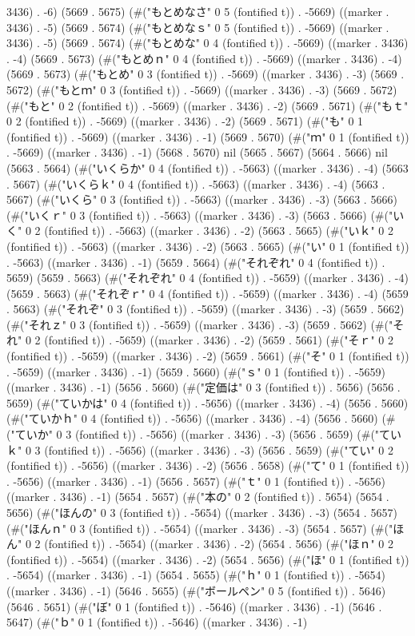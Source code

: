 3436) . -6) (5669 . 5675) (#("もとめなさ" 0 5 (fontified t)) . -5669) ((marker . 3436) . -5) (5669 . 5674) (#("もとめなｓ" 0 5 (fontified t)) . -5669) ((marker . 3436) . -5) (5669 . 5674) (#("もとめな" 0 4 (fontified t)) . -5669) ((marker . 3436) . -4) (5669 . 5673) (#("もとめｎ" 0 4 (fontified t)) . -5669) ((marker . 3436) . -4) (5669 . 5673) (#("もとめ" 0 3 (fontified t)) . -5669) ((marker . 3436) . -3) (5669 . 5672) (#("もとｍ" 0 3 (fontified t)) . -5669) ((marker . 3436) . -3) (5669 . 5672) (#("もと" 0 2 (fontified t)) . -5669) ((marker . 3436) . -2) (5669 . 5671) (#("もｔ" 0 2 (fontified t)) . -5669) ((marker . 3436) . -2) (5669 . 5671) (#("も" 0 1 (fontified t)) . -5669) ((marker . 3436) . -1) (5669 . 5670) (#("ｍ" 0 1 (fontified t)) . -5669) ((marker . 3436) . -1) (5668 . 5670) nil (5665 . 5667) (5664 . 5666) nil (5663 . 5664) (#("いくらか" 0 4 (fontified t)) . -5663) ((marker . 3436) . -4) (5663 . 5667) (#("いくらｋ" 0 4 (fontified t)) . -5663) ((marker . 3436) . -4) (5663 . 5667) (#("いくら" 0 3 (fontified t)) . -5663) ((marker . 3436) . -3) (5663 . 5666) (#("いくｒ" 0 3 (fontified t)) . -5663) ((marker . 3436) . -3) (5663 . 5666) (#("いく" 0 2 (fontified t)) . -5663) ((marker . 3436) . -2) (5663 . 5665) (#("いｋ" 0 2 (fontified t)) . -5663) ((marker . 3436) . -2) (5663 . 5665) (#("い" 0 1 (fontified t)) . -5663) ((marker . 3436) . -1) (5659 . 5664) (#("それぞれ" 0 4 (fontified t)) . 5659) (5659 . 5663) (#("それぞれ" 0 4 (fontified t)) . -5659) ((marker . 3436) . -4) (5659 . 5663) (#("それぞｒ" 0 4 (fontified t)) . -5659) ((marker . 3436) . -4) (5659 . 5663) (#("それぞ" 0 3 (fontified t)) . -5659) ((marker . 3436) . -3) (5659 . 5662) (#("それｚ" 0 3 (fontified t)) . -5659) ((marker . 3436) . -3) (5659 . 5662) (#("それ" 0 2 (fontified t)) . -5659) ((marker . 3436) . -2) (5659 . 5661) (#("そｒ" 0 2 (fontified t)) . -5659) ((marker . 3436) . -2) (5659 . 5661) (#("そ" 0 1 (fontified t)) . -5659) ((marker . 3436) . -1) (5659 . 5660) (#("ｓ" 0 1 (fontified t)) . -5659) ((marker . 3436) . -1) (5656 . 5660) (#("定価は" 0 3 (fontified t)) . 5656) (5656 . 5659) (#("ていかは" 0 4 (fontified t)) . -5656) ((marker . 3436) . -4) (5656 . 5660) (#("ていかｈ" 0 4 (fontified t)) . -5656) ((marker . 3436) . -4) (5656 . 5660) (#("ていか" 0 3 (fontified t)) . -5656) ((marker . 3436) . -3) (5656 . 5659) (#("ていｋ" 0 3 (fontified t)) . -5656) ((marker . 3436) . -3) (5656 . 5659) (#("てい" 0 2 (fontified t)) . -5656) ((marker . 3436) . -2) (5656 . 5658) (#("て" 0 1 (fontified t)) . -5656) ((marker . 3436) . -1) (5656 . 5657) (#("ｔ" 0 1 (fontified t)) . -5656) ((marker . 3436) . -1) (5654 . 5657) (#("本の" 0 2 (fontified t)) . 5654) (5654 . 5656) (#("ほんの" 0 3 (fontified t)) . -5654) ((marker . 3436) . -3) (5654 . 5657) (#("ほんｎ" 0 3 (fontified t)) . -5654) ((marker . 3436) . -3) (5654 . 5657) (#("ほん" 0 2 (fontified t)) . -5654) ((marker . 3436) . -2) (5654 . 5656) (#("ほｎ" 0 2 (fontified t)) . -5654) ((marker . 3436) . -2) (5654 . 5656) (#("ほ" 0 1 (fontified t)) . -5654) ((marker . 3436) . -1) (5654 . 5655) (#("ｈ" 0 1 (fontified t)) . -5654) ((marker . 3436) . -1) (5646 . 5655) (#("ボールペン" 0 5 (fontified t)) . 5646) (5646 . 5651) (#("ぼ" 0 1 (fontified t)) . -5646) ((marker . 3436) . -1) (5646 . 5647) (#("ｂ" 0 1 (fontified t)) . -5646) ((marker . 3436) . -1) 